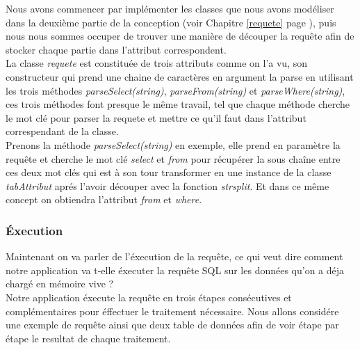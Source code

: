 \documentclass[oneside,13pt,a4paper]{report}
\begin{document}
Nous avons commencer par implémenter les classes que nous avons modéliser dans la deuxième partie de la conception (voir Chapitre \ref{requete} page \pageref{requete}), puis nous nous sommes occuper de trouver une manière de découper la requête afin de stocker chaque partie dans l'attribut correspondent.
\\
La classe \textit{requete} est constituée de trois attributs comme on l'a vu, son constructeur qui prend une chaine de caractères en argument la parse en utilisant les trois méthodes \textit{parseSelect(string)}, \textit{parseFrom(string)} et \textit{parseWhere(string)}, ces trois méthodes font presque le même travail, tel que chaque méthode cherche le mot clé pour parser la requete et mettre ce qu'il faut dans l'attribut correspendant de la classe.
\\
Prenons la méthode \textit{parseSelect(string)} en exemple, elle prend en paramètre la requête et cherche le mot clé \textit{select} et \textit{from} pour récupérer la sous chaîne entre ces deux mot clés qui est à son tour transformer en une instance de la classe \textit{tabAttribut} aprés l'avoir découper avec la fonction \textit{strsplit}. Et dans ce même concept on obtiendra l'attribut \textit{from} et \textit{where}.

\subsubsection{Éxecution}
Maintenant on va parler de l'éxecution de la requête, ce qui veut dire comment notre application va t-elle éxecuter la requête SQL sur les données qu'on a déja chargé en mémoire vive ?
\\
Notre application éxecute la requête en trois étapes consécutives et complémentaires pour éffectuer le traitement nécessaire.
Nous allons considére une exemple de requête ainsi que deux table de données afin de voir étape par étape le resultat de chaque traitement.
\end{document}
